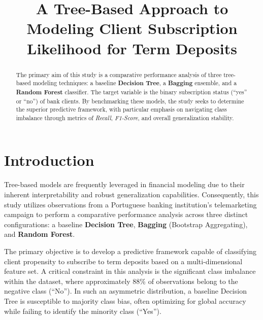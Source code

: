\documentclass[conference]{IEEEtran}
\begin{document}
\title{A Tree-Based Approach to Modeling Client Subscription Likelihood for Term Deposits}

\author{
}


\maketitle
\renewcommand{\abstractname}{Summary}
\begin{abstract}
The primary aim of this study is a comparative performance analysis of three tree-based modeling techniques: a baseline \textbf{Decision Tree}, a \textbf{Bagging} ensemble, and a \textbf{Random Forest} classifier. The target variable is the binary subscription status (``yes'' or ``no'') of bank clients. By benchmarking these models, the study seeks to determine the superior predictive framework, with particular emphasis on navigating class imbalance through metrics of \textit{Recall}, \textit{F1-Score}, and overall generalization stability.\\
\end{abstract}

\section{\textbf{Introduction}}
\indent Tree-based models are frequently leveraged in financial modeling due to their inherent interpretability and robust generalization capabilities. Consequently, this study utilizes observations from a Portuguese banking institution's telemarketing campaign to perform a comparative performance analysis across three distinct configurations: a baseline \textbf{Decision Tree}, \textbf{Bagging} (Bootstrap Aggregating), and \textbf{Random Forest}.

The primary objective is to develop a predictive framework capable of classifying client propensity to subscribe to term deposits based on a multi-dimensional feature set. A critical constraint in this analysis is the significant class imbalance within the dataset, where approximately 88\% of observations belong to the negative class (``No''). In such an asymmetric distribution, a baseline Decision Tree is susceptible to majority class bias, often optimizing for global accuracy while failing to identify the minority class (``Yes'').
\end{document}
